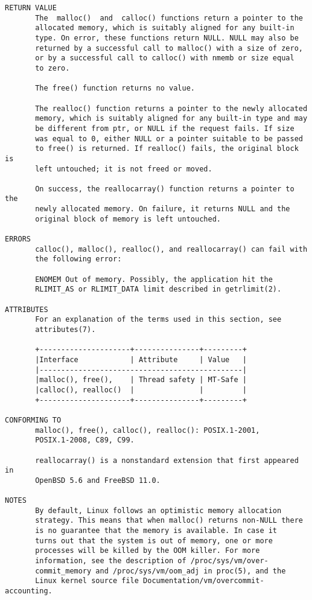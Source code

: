 {\begin{center}
\begin{verbatim}
RETURN VALUE
       The  malloc()  and  calloc() functions return a pointer to the
       allocated memory, which is suitably aligned for any built-in
       type. On error, these functions return NULL. NULL may also be
       returned by a successful call to malloc() with a size of zero,
       or by a successful call to calloc() with nmemb or size equal
       to zero.

       The free() function returns no value.

       The realloc() function returns a pointer to the newly allocated
       memory, which is suitably aligned for any built-in type and may
       be different from ptr, or NULL if the request fails. If size
       was equal to 0, either NULL or a pointer suitable to be passed
       to free() is returned. If realloc() fails, the original block is
       left untouched; it is not freed or moved.

       On success, the reallocarray() function returns a pointer to the
       newly allocated memory. On failure, it returns NULL and the
       original block of memory is left untouched.

ERRORS
       calloc(), malloc(), realloc(), and reallocarray() can fail with
       the following error:

       ENOMEM Out of memory. Possibly, the application hit the
       RLIMIT_AS or RLIMIT_DATA limit described in getrlimit(2).

ATTRIBUTES
       For an explanation of the terms used in this section, see
       attributes(7).

       +---------------------+---------------+---------+
       |Interface            | Attribute     | Value   |
       |-----------------------------------------------|
       |malloc(), free(),    | Thread safety | MT-Safe |
       |calloc(), realloc()  |               |         |
       +---------------------+---------------+---------+

CONFORMING TO
       malloc(), free(), calloc(), realloc(): POSIX.1-2001,
       POSIX.1-2008, C89, C99.

       reallocarray() is a nonstandard extension that first appeared in
       OpenBSD 5.6 and FreeBSD 11.0.

NOTES
       By default, Linux follows an optimistic memory allocation
       strategy. This means that when malloc() returns non-NULL there
       is no guarantee that the memory is available. In case it
       turns out that the system is out of memory, one or more
       processes will be killed by the OOM killer. For more
       information, see the description of /proc/sys/vm/over-    
       commit_memory and /proc/sys/vm/oom_adj in proc(5), and the
       Linux kernel source file Documentation/vm/overcommit-accounting.


\end{verbatim}
\end{center}}
